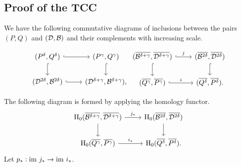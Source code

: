 
\subsection{Proof of the TCC}

We have the following commutative diagrams of inclusions between the pairs $(P,Q)$ and $({\mathcal{D}}, {\mathcal{B}})$ and their complements with increasing scale.

\[ \begin{tikzcd}
(P^\delta, Q^\delta) \arrow[hookrightarrow]{r}\arrow[hookrightarrow]{d}& (P^\gamma, Q^\gamma) \arrow[hookrightarrow]{d} \\%
(\D^{2\delta}, \B^{2\delta}) \arrow[hookrightarrow]{r} & (\D^{\delta+\gamma}, \B^{\delta+\gamma}),
\end{tikzcd}
\begin{tikzcd}
(\overline{\B^{\delta+\gamma}}, \overline{\D^{\delta+\gamma}})\arrow[hookrightarrow]{r}{j}\arrow[hookrightarrow]{d}& (\overline{\B^{2\delta}}, \overline{\D^{2\delta}}) \arrow[hookrightarrow]{d} \\%
(\overline{Q^\gamma}, \overline{P^\gamma}) \arrow[hookrightarrow]{r}{i} & (\overline{Q^\delta}, \overline{P^\delta}).
\end{tikzcd}\]

The following diagram is formed by applying the homology functor.
\begin{equation}\label{dgm:1}
    \begin{tikzcd}
    \hom_0(\overline{\B^{\delta+\gamma}}, \overline{\D^{\delta+\gamma}})\arrow{r}{j_*}\arrow{d}& \hom_0(\overline{\B^{2\delta}}, \overline{\D^{2\delta}}) \arrow{d} \\%
    \hom_0(\overline{Q^\gamma}, \overline{P^\gamma}) \arrow{r}{i_*} & \hom_0(\overline{Q^\delta}, \overline{P^\delta}).
    \end{tikzcd}
\end{equation}
Let $p_* : \mathrm{im}~j_*\to\mathrm{im}~i_*$.


